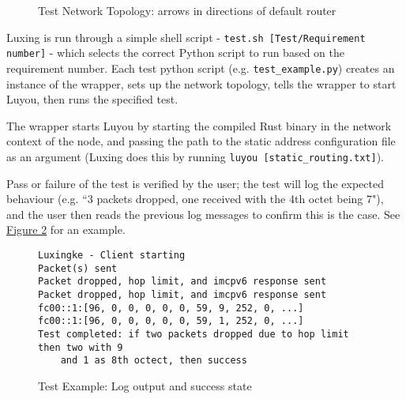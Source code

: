 \documentclass[12pt,a4paper,twoside,openany]{report}
\begin{document}
\begin{figure}
\centering
{}
\caption{Test Network Topology: arrows in directions of default router}
\label{fig::test_network}
\end{figure}

\bigskip

Luxing is run through a simple shell script - \verb!test.sh [Test/Requirement number]! - which selects the correct Python script to run based on the requirement number. Each test python script (e.g. \verb!test_example.py!) creates an instance of the wrapper, sets up the network topology, tells the wrapper to start Luyou, then runs the specified test. 

The wrapper starts Luyou by starting the compiled Rust binary in the network context of the node, and passing the path to the static address configuration file as an argument (Luxing does this by running \verb!luyou [static_routing.txt]!).

\bigskip

Pass or failure of the test is verified by the user; the test will log the expected behaviour (e.g. ``3 packets dropped, one received with the 4th octet being 7"), and the user then reads the previous log messages to confirm this is the case. See \hyperref[fig::test_success]{Figure }\ref{fig::test_success} for an example.

\begin{figure}
\begin{verbatim}
Luxingke - Client starting
Packet(s) sent
Packet dropped, hop limit, and imcpv6 response sent
Packet dropped, hop limit, and imcpv6 response sent
fc00::1:[96, 0, 0, 0, 0, 0, 59, 9, 252, 0, ...]
fc00::1:[96, 0, 0, 0, 0, 0, 59, 1, 252, 0, ...]
Test completed: if two packets dropped due to hop limit then two with 9 
    and 1 as 8th octect, then success
\end{verbatim}
\caption{Test Example: Log output and success state}
\label{fig::test_success}
\end{figure}
\end{document}
